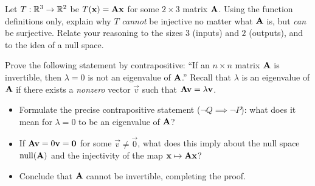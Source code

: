 \begin{exercise}
Let $T:\mathbb{R}^3 \to \mathbb{R}^2$ be $T(\mathbf{x}) = \mathbf{A}\mathbf{x}$ for some $2\times 3$ matrix
$\mathbf{A}$. Using the function definitions only, explain why $T$ \emph{cannot} be injective
no matter what $\mathbf{A}$ is, but \emph{can} be surjective. Relate your reasoning to the
sizes $3$ (inputs) and $2$ (outputs), and to the idea of a null space.
\end{exercise}

\begin{exercise}
\label{ch38:ex-contrapositive}
Prove the following statement by contrapositive: ``If an $n\times n$ matrix $\mathbf{A}$ is
invertible, then $\lambda = 0$ is not an eigenvalue of $\mathbf{A}$.''
Recall that $\lambda$ is an eigenvalue of $\mathbf{A}$ if there exists a \emph{nonzero} vector
$\vec{v}$ such that $\mathbf{A}\mathbf{v} = \lambda\mathbf{v}$.
\begin{itemize}
  \item[(a)] Formulate the precise contrapositive statement ($\neg Q \implies \neg P$):
        what does it mean for $\lambda = 0$ to be an eigenvalue of $\mathbf{A}$?
  \item[(b)] If $\mathbf{A}\mathbf{v} = 0\mathbf{v} = \mathbf{0}$ for some $\vec{v} \ne \vec{0}$,
        what does this imply about the null space $\operatorname{null}(\mathbf{A})$ and the injectivity of the map $\mathbf{x}\mapsto\mathbf{A}\mathbf{x}$?
  \item[(c)] Conclude that $\mathbf{A}$ cannot be invertible, completing the proof.
\end{itemize}
\end{exercise}

